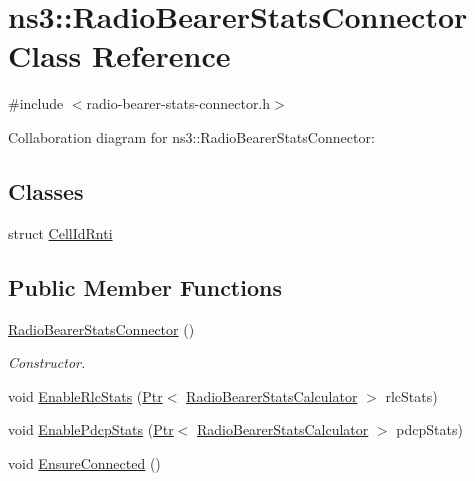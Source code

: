 \hypertarget{classns3_1_1RadioBearerStatsConnector}{}\section{ns3\+:\+:Radio\+Bearer\+Stats\+Connector Class Reference}
\label{classns3_1_1RadioBearerStatsConnector}


{\ttfamily \#include $<$radio-\/bearer-\/stats-\/connector.\+h$>$}



Collaboration diagram for ns3\+:\+:Radio\+Bearer\+Stats\+Connector\+:
\subsection*{Classes}
\begin{DoxyCompactItemize}
\item 
struct \hyperlink{structns3_1_1RadioBearerStatsConnector_1_1CellIdRnti}{Cell\+Id\+Rnti}
\end{DoxyCompactItemize}
\subsection*{Public Member Functions}
\begin{DoxyCompactItemize}
\item 
\hyperlink{classns3_1_1RadioBearerStatsConnector_aa448892cf741bbd354462fc17160e347}{Radio\+Bearer\+Stats\+Connector} ()
\begin{DoxyCompactList}\small\item\em Constructor. \end{DoxyCompactList}\item 
void \hyperlink{classns3_1_1RadioBearerStatsConnector_a75ac2448eff569ea1b65671365191e2e}{Enable\+Rlc\+Stats} (\hyperlink{classns3_1_1Ptr}{Ptr}$<$ \hyperlink{classns3_1_1RadioBearerStatsCalculator}{Radio\+Bearer\+Stats\+Calculator} $>$ rlc\+Stats)
\item 
void \hyperlink{classns3_1_1RadioBearerStatsConnector_a28d09ec1f97c680dfe67ab91150fdfa4}{Enable\+Pdcp\+Stats} (\hyperlink{classns3_1_1Ptr}{Ptr}$<$ \hyperlink{classns3_1_1RadioBearerStatsCalculator}{Radio\+Bearer\+Stats\+Calculator} $>$ pdcp\+Stats)
\item 
void \hyperlink{classns3_1_1RadioBearerStatsConnector_aba249ded64e78b11c7d2d54354118154}{Ensure\+Connected} ()
\end{DoxyCompactItemize}

